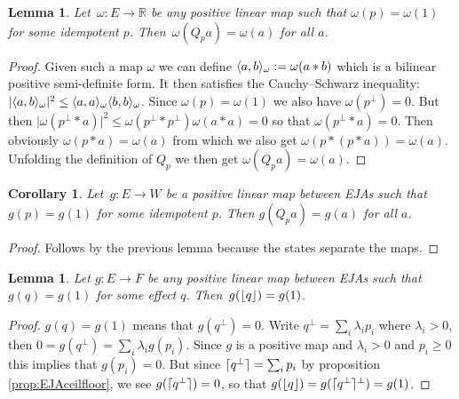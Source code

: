\documentclass[submission,copyright,creativecommons]{eptcs}
\newcounter{main}
\newtheorem{lemma}[main]{Lemma}
\newtheorem{corollary}[main]{Corollary}
\theoremstyle{definition}
\DeclarePairedDelimiter{\ceil}{\lceil}{\rceil}
\DeclarePairedDelimiter{\floor}{\lfloor}{\rfloor}
\DeclarePairedDelimiter{\inn}{\langle}{\rangle}
\newcommand\R{\mathbb{R}}
\begin{document}
\begin{lemma}
	Let~$\omega\colon E\rightarrow \R$ be any positive linear map such that $\omega(p)=\omega(1)$ for some idempotent $p$. Then~$\omega(Q_pa)=\omega(a)$ for all $a$.
\end{lemma}
\begin{proof}
	Given such a map $\omega$ we can define $\inn{a,b}_\omega
	:= \omega(a*b)$ which is a bilinear positive semi-definite
	form. It then satisfies the Cauchy--Schwarz inequality:
	$\lvert \inn{a,b}_\omega\rvert^2 \leq \inn{a,a}_\omega
	\inn{b,b}_\omega$. Since $\omega(p)=\omega(1)$ we also have
	$\omega(p^\perp)=0$. But then $\lvert \omega(p^\perp*a)\rvert^2
	\leq \omega(p^\perp*p^\perp)\omega(a*a) = 0$ so that
	$\omega(p^\perp*a) = 0$. Then obviously $\omega(p*a) =
	\omega(a)$ from which we also get $\omega(p*(p*a))=\omega(a)$.
	Unfolding the definition of $Q_p$ we then get
	$\omega(Q_pa)=\omega(a)$.
\end{proof}
\begin{corollary}\label{cor:factorimage}
	Let~$g\colon E\rightarrow W$ be a positive linear map between EJAs
    such that $g(p)=g(1)$ for some idempotent $p$. Then $g(Q_pa)= g(a)$ for all $a$.
\end{corollary}
\begin{proof}
	Follows by the previous lemma because the states separate the maps.
\end{proof}

\begin{lemma}\label{lem:EJAfloor1}
	Let $g\colon E\rightarrow F$ be any positive linear map between EJAs
    such that $g(q)=g(1)$ for some effect $q$.
    Then~$g(\floor{q})=g(1)$.
\end{lemma}
\begin{proof}
	$g(q)=g(1)$ means that $g(q^\perp) = 0$. Write $q^\perp = \sum_i \lambda_i p_i$ where $\lambda_i>0$, then $0=g(q^\perp) = \sum_i \lambda_i g(p_i)$. Since $g$ is a positive map and $\lambda_i>0$ and $p_i\geq 0$ this implies that $g(p_i)=0$. But since $\ceil{q^\perp} = \sum_i p_i$ by proposition \ref{prop:EJAceilfloor}, we see $g(\ceil{q^\perp})=0$, so that $g(\floor{q})= g(\ceil{q^\perp}^\perp) = g(1)$.
\end{proof}
\end{document}
